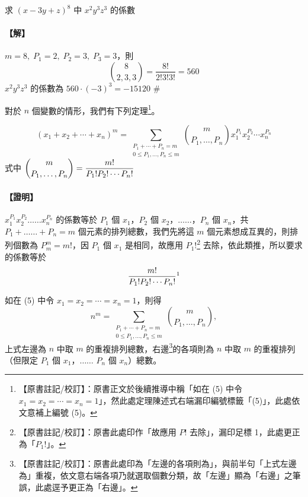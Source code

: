 \medskip
\begin{example}\label{ex:b5-2-22}
求 $(x - 3y + z)^8$ 中 $x^2 y^3 z^3$ 的係數
\end{example}
\paragraph{【解】}
$m = 8,\; P_1 = 2,\; P_2 = 3,\; P_3 = 3$，則
\[ \binom{8}{2, 3, 3} = \frac{8!}{2! 3! 3!} = 560 \]
$x^2 y^3 z^3$ 的係數為 $560 \cdot (-3)^3 = -15120$ \hfill \#

\bigskip
對於 $n$ 個變數的情形，我們有下列定理\label{note:b5-ch2-p91-eq5}\footnote{【原書註記/校訂】：原書正文於後續推導中稱「如在 (5) 中令 $x_1 = x_2 = \cdots = x_n = 1$」，然此處定理陳述式右端漏印編號標籤「(5)」，此處依文意補上編號 (5)。}。

\medskip
\begin{theorem}[多項式定理]\label{thm:b5-2-11}
\begin{equation}
(x_1 + x_2 + \dotsb + x_n)^m = \sum_{\substack{P_1 + \dotsb + P_n = m \\ 0 \le P_1, \dots, P_n \le m}} \binom{m}{P_1, \dots, P_n} x_1^{P_1} x_2^{P_2} \dotsb x_n^{P_n} \label{eq:b5-2-4-5}\tag{5}
\end{equation}
式中 $\dbinom{m}{P_1, \dots, P_n} = \dfrac{m!}{P_1! P_2! \dotsm P_n!}$
\end{theorem}
\paragraph{【證明】}
$x_1^{P_1} x_2^{P_2} \dots\dots x_n^{P_n}$ 的係數等於 $P_1$ 個 $x_1$，$P_2$ 個 $x_2$，$\dots\dots$，$P_n$ 個 $x_n$，共 $P_1 + \dots\dots + P_n = m$ 個元素的排列總數，我們先將這 $m$ 個元素想成互異的，則排列個數為 $P^m_m = m!$，因 $P_1$ 個 $x_1$ 是相同，故應用 $P_1!$\label{note:b5-ch2-p91-p1}\footnote{【原書註記/校訂】：原書此處印作「故應用 $P!$ 去除」，漏印足標 1，此處更正為「$P_1!$」。} 去除，依此類推，所以要求的係數等於
\[ \frac{m!}{P_1! P_2! \dotsm P_n!}\footnotemark \]
\label{note:b5-ch2-p91-pm}

如在 (5) 中令 $x_1 = x_2 = \dotsb = x_n = 1$，則得
\[ n^m = \sum_{\substack{P_1 + \dotsb + P_n = m \\ 0 \le P_1, \dots, P_n \le m}} \binom{m}{P_1, \dots, P_n}, \]
上式左邊為 $n$ 中取 $m$ 的重複排列總數，右邊\label{note:b5-ch2-p91-right}\footnote{【原書註記/校訂】：原書此處印為「左邊的各項則為」，與前半句「上式左邊為」重複，依文意右端各項乃就選取個數分類，故「左邊」顯為「右邊」之筆誤，此處逕予更正為「右邊」。}的各項則為 $n$ 中取 $m$ 的重複排列（但限定 $P_1$ 個 $x_1$，$\dots\dots$ $P_n$ 個 $x_n$）總數。

